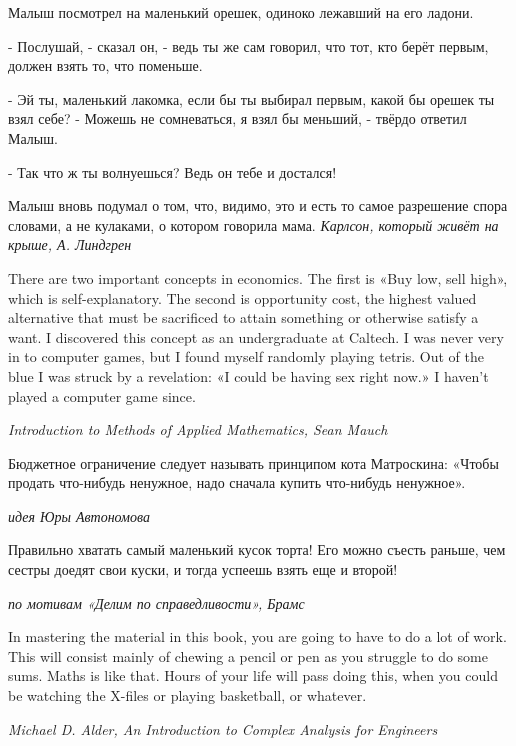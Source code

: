 Малыш посмотрел на маленький орешек, одиноко лежавший на его ладони.

- Послушай, - сказал он, - ведь ты же сам говорил, что тот, кто берёт первым, должен взять то, что поменьше.

- Эй ты, маленький лакомка, если бы ты выбирал первым, какой бы орешек ты взял себе? - Можешь не сомневаться, я взял бы меньший, - твёрдо ответил Малыш.

- Так что ж ты волнуешься? Ведь он тебе и достался!

Малыш вновь подумал о том, что, видимо, это и есть то самое разрешение спора словами, а не кулаками, о котором говорила мама.
{\it Карлсон, который живёт на крыше,  А. Линдгрен}
\vspace{0.5cm}


There are two important concepts in economics. The first is «Buy low, sell high», which is self-explanatory. The second is opportunity cost, the highest valued alternative that must be sacrificed to attain something or otherwise satisfy a want. I discovered this concept as an undergraduate at Caltech. I was never very in to computer games, but I found myself randomly playing tetris. Out of the blue I was struck by a revelation: «I could be having sex right now.» I haven't played a computer game since.\par
{\it Introduction to Methods of Applied Mathematics, Sean Mauch}\par
\vspace{0.5cm}

Бюджетное ограничение следует называть принципом кота Матроскина: «Чтобы продать что-нибудь ненужное, надо сначала купить что-нибудь ненужное».\par
{\it идея Юры Автономова}\par
\vspace{0.5cm}
Правильно хватать самый маленький кусок торта! Его можно съесть раньше, чем сестры доедят свои куски, и тогда успеешь взять еще и второй!\par
{\it по мотивам «Делим по справедливости», Брамс}\par

\vspace{0.5cm}

In mastering the material in this book, you are going to have to do a lot of work. This will consist mainly of chewing a pencil or pen as you struggle to do some sums. Maths is like that. Hours of your life will pass doing this, when you could be watching the X-files or playing basketball, or whatever.\par
{\it Michael D. Alder, An Introduction to  Complex Analysis for Engineers}\par
\vspace{0.5cm}

